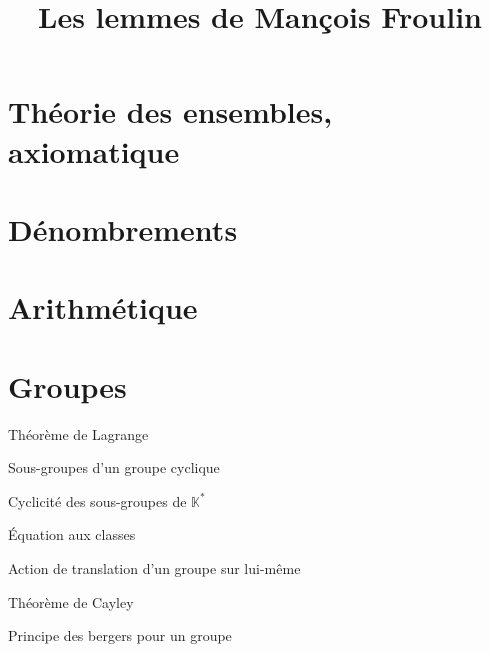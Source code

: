 \documentclass[french]{article}
\title{Les lemmes de Mançois Froulin}
\date{}
\newcommand{\K}{\mathbb{K}}
\newcommand{\st}{^*}
\theoremstyle{theorem}
\theoremstyle{definition}
\begin{document}
\maketitle

\section{Théorie des ensembles, axiomatique}

\section{Dénombrements}

\section{Arithmétique}

\section{Groupes}

\begin{lem}{Théorème de Lagrange}
	
\end{lem}

\begin{lem}{Sous-groupes d'un groupe cyclique}
	
\end{lem}

\begin{lem}{Cyclicité des sous-groupes de $\K\st$}
	
\end{lem}

\begin{lem}{Équation aux classes}
	
\end{lem}

\begin{lem}{Action de translation d'un groupe sur lui-même}
	
\end{lem}

\begin{lem}{Théorème de Cayley}
	
\end{lem}

\begin{lem}{Principe des bergers pour un groupe}
	
\end{lem}
\end{document}
